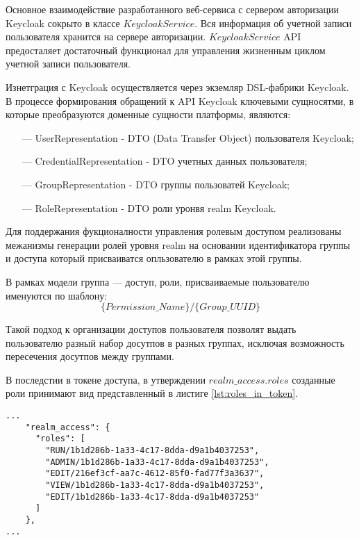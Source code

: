Основное взаимодействие разработанного веб-сервиса с сервером авторизации Keycloak сокрыто в классе $KeycloakService$.
Вся информация об учетной записи пользователя хранится на сервере авторизации.
$KeycloakService$ API предосталяет достаточный функционал для управления жизненным циклом учетной записи пользователя.

Изнетграция с Keycloak осуществляется через экземляр DSL-фабрики Keycloak.
В процессе формирования обращений к API Keycloak ключевыми сущносятми, в которые преобразуются доменные сущности платформы, являются:

\begin{itemize}
  \item[---] UserRepresentation - DTO (Data Transfer Object) пользователя Keycloak;
  \item[---] CredentialRepresentation - DTO учетных данных пользователя;
  \item[---] GroupRepresentation - DTO группы пользоватей Keycloak;
  \item[---] RoleRepresentation - DTO роли уронвя realm Keycloak.
\end{itemize}

Для поддержания фукционалности управления ролевым доступом реализованы межанизмы генерации ролей уровня realm на основании идентификатора группы и доступа который присваиватся опльзователю в рамках этой группы.

В рамках модели группа --- доступ, роли, присваиваемые пользователю именуются по шаблону:
$$
\{Permission\_Name\}/\{Group\_UUID\}
$$

Такой подход к организации доступов пользователя позволят выдать пользователю разный набор досутпов в разных группах, исключая возможность пересечения досутпов между группами.

В последстии в токене доступа, в утверждении $realm\_access.roles$ созданные роли принимают вид представленный в листиге \ref{lst:roles_in_token}.

\begin{lstlisting}[caption={Пример представления ролей пользователе в токене досутпа}, label=lst:roles_in_token]
...
    "realm_access": {
      "roles": [
        "RUN/1b1d286b-1a33-4c17-8dda-d9a1b4037253",
        "ADMIN/1b1d286b-1a33-4c17-8dda-d9a1b4037253",
        "EDIT/216ef3cf-aa7c-4612-85f0-fad77f3a3637",
        "VIEW/1b1d286b-1a33-4c17-8dda-d9a1b4037253",
        "EDIT/1b1d286b-1a33-4c17-8dda-d9a1b4037253"
      ]
    },
...
\end{lstlisting}

